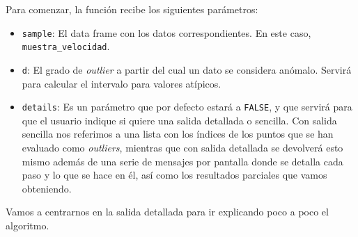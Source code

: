 \documentclass[12pt]{report}\usepackage[]{graphicx}\usepackage[dvipsnames]{xcolor}
\begin{document}
					Para comenzar, la función recibe los siguientes parámetros:
					\begin{itemize}
						\item \texttt{sample}: El data frame con los datos correspondientes. En este caso, \texttt{muestra\_velocidad}. 
						\item \texttt{d}: El grado de \textit{outlier} a partir del cual un dato se considera anómalo. Servirá para calcular el intervalo para valores atípicos.
						\item \texttt{details}: Es un parámetro que por defecto estará a \texttt{FALSE}, y que servirá para que el usuario indique si quiere una salida detallada o sencilla. Con salida sencilla nos referimos a una lista con los índices de los puntos que se han evaluado como \textit{outliers}, mientras que con salida detallada se devolverá esto mismo además de una serie de mensajes por pantalla donde se detalla cada paso y lo que se hace en él, así como los resultados parciales que vamos obteniendo.
					\end{itemize}
					
					Vamos a centrarnos en la salida detallada para ir explicando poco a poco el algoritmo.\\
					
\end{document}
